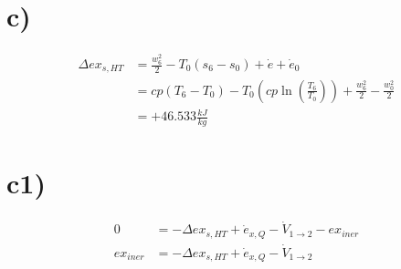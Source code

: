 

\section*{c)}

\begin{align*}
\Delta ex_{s,HT} &= \frac{w_6^2}{2} - T_0 (s_6 - s_0) + \dot{e} + \dot{e}_0 \\
&= cp (T_6 - T_0) - T_0 \left( cp \ln \left( \frac{T_6}{T_0} \right) \right) + \frac{w_6^2}{2} - \frac{w_0^2}{2} \\
&= + 46.533 \frac{kJ}{kg}
\end{align*}

\section*{c1)}

\begin{align*}
0 &= -\Delta ex_{s,HT} + \dot{e}_{x,Q} - \dot{V}_{1 \rightarrow 2} - ex_{iner} \\
ex_{iner} &= -\Delta ex_{s,HT} + \dot{e}_{x,Q} - \dot{V}_{1 \rightarrow 2}
\end{align*}